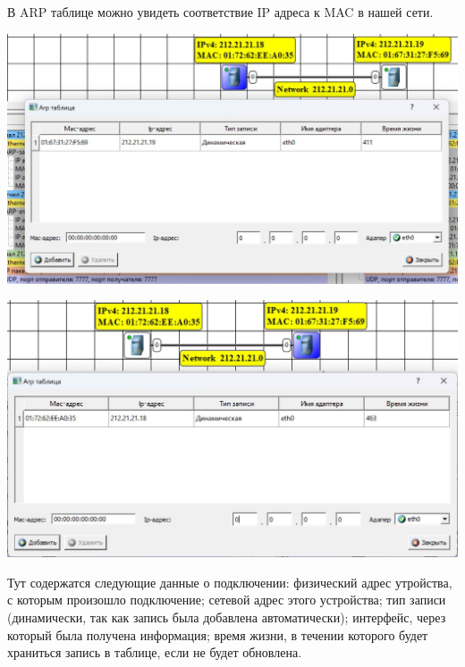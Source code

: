 \documentclass{article}
\begin{document}
В ARP таблице можно увидеть соответствие IP адреса к MAC в нашей сети.
\\
\begin{minipage}{.5\textwidth}    
    \begin{center}
        \includegraphics[width=.9\textwidth]{3}
    \end{center}
\end{minipage}
\hfil
\begin{minipage}{.5\textwidth}    
    \begin{center}
        \includegraphics[width=.9\textwidth]{4}
    \end{center}
\end{minipage}
Тут содержатся следующие данные о подключении: физический адрес утройства, с которым произошло подключение; сетевой адрес этого устройства; тип записи (динамически, так как запись была добавлена автоматически); интерфейс, через который была получена информация; время жизни, в течении которого будет храниться запись в таблице, если не будет обновлена.
\end{document}
